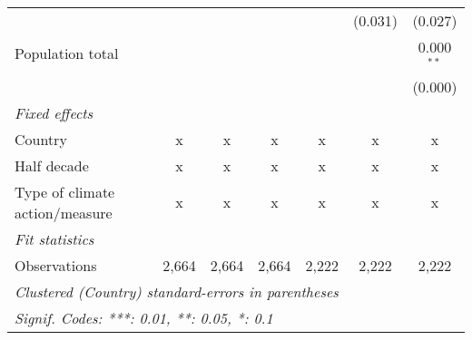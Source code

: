 \begin{tabular}{lcccccc}
                                            &                &                &                &                & (0.031)        & (0.027)\\   
   Population total                         &                &                &                &                &                & 0.000$^{**}$\\   
                                            &                &                &                &                &                & (0.000)\\   
   \emph{Fixed effects}\\
   Country                                  & x              & x              & x              & x              & x              & x\\  
   Half decade                              & x              & x              & x              & x              & x              & x\\  
   Type of climate action/measure           & x              & x              & x              & x              & x              & x\\  
   \midrule \emph{Fit statistics}\\
   Observations                             & 2,664          & 2,664          & 2,664          & 2,222          & 2,222          & 2,222\\  
   \midrule
   \multicolumn{7}{l}{\emph{Clustered (Country) standard-errors in parentheses}}\\
   \multicolumn{7}{l}{\emph{Signif. Codes: ***: 0.01, **: 0.05, *: 0.1}}\\
\end{tabular}
\par\endgroup


